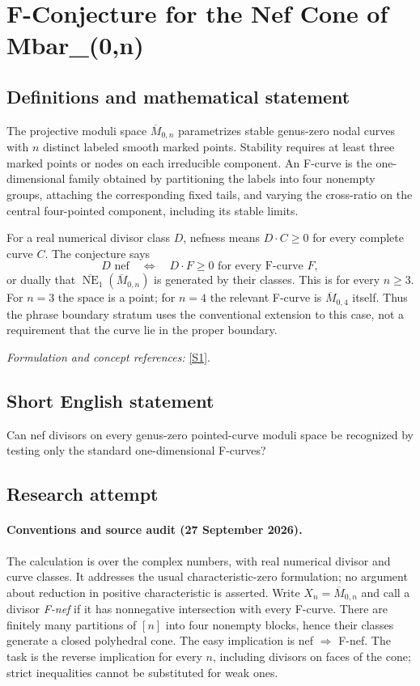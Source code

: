 \documentclass[11pt]{article}
\begin{document}
\section*{\texorpdfstring{F-Conjecture for the Nef Cone of Mbar\_(0,n)}{F-Conjecture for the Nef Cone of Mbar\_(0,n)}}\label{499}
\subsection{Definitions and mathematical statement}
The projective moduli space $\overline M_{0,n}$ parametrizes stable genus-zero nodal curves with $n$ distinct labeled smooth marked points. Stability requires at least three marked points or nodes on each irreducible component. An F-curve is the one-dimensional family obtained by partitioning the labels into four nonempty groups, attaching the corresponding fixed tails, and varying the cross-ratio on the central four-pointed component, including its stable limits.

For a real numerical divisor class $D$, nefness means $D\cdot C\ge0$ for every complete curve $C$. The conjecture says
\[
 D\text{ nef}\quad\Longleftrightarrow\quad
 D\cdot F\ge0\text{ for every F-curve }F,
\]
or dually that $\overline{\operatorname{NE}}_1(\overline M_{0,n})$ is generated by their classes. This is for every $n\ge3$. For $n=3$ the space is a point; for $n=4$ the relevant F-curve is $\overline M_{0,4}$ itself. Thus the phrase boundary stratum uses the conventional extension to this case, not a requirement that the curve lie in the proper boundary.
\par\smallskip\textit{Formulation and concept references:} \href{https://arxiv.org/html/2507.12434v1}{[S1]}.

\subsection{Short English statement}
Can nef divisors on every genus-zero pointed-curve moduli space be recognized by testing only the standard one-dimensional F-curves?
\subsection{Research attempt}

\paragraph{Conventions and source audit (27 September 2026).}
The calculation is over the complex numbers, with real numerical divisor
and curve classes. It addresses the usual characteristic-zero formulation;
no argument about reduction in positive characteristic is asserted. Write
$X_n=\overline M_{0,n}$ and call a divisor \emph{F-nef} if it has nonnegative
intersection with every F-curve. There are finitely many partitions of
$[n]$ into four nonempty blocks, hence their classes generate a closed
polyhedral cone. The easy implication is nef $\Rightarrow$ F-nef. The task
is the reverse implication for every $n$, including divisors on faces of
the cone; strict inequalities cannot be substituted for weak ones.
\end{document}
